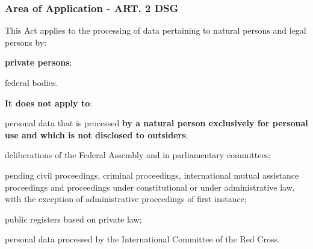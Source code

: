 \subsubsection{Area of Application - ART. 2 DSG}
\begin{compactenum}
	\item This Act applies to the processing of data pertaining to natural persons and legal persons by:
	\begin{compactenum}
		\item \textbf{private persons};
		\item federal bodies.
	\end{compactenum}
	\item \textbf{It does not apply to}:
	\begin{compactenum}
		\item personal data that is processed \textbf{by a natural person exclusively for personal use and which is not	disclosed to outsiders};
		\item deliberations of the Federal Assembly and in parliamentary committees;
		\item pending civil proceedings, criminal proceedings, international mutual assistance proceedings and proceedings under constitutional or under administrative law, with the exception of administrative proceedings of first instance;
		\item public registers based on private law;
		\item personal data processed by the International Committee of the Red Cross.
	\end{compactenum}
\end{compactenum}

